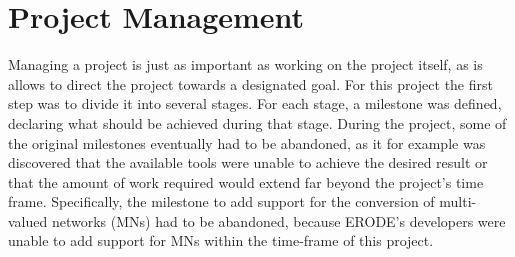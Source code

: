 \chapter{Project Management} \label{management}
Managing a project is just as important as working on the project itself, as is allows to direct the project towards a designated goal. For this project the first step was to divide it into several stages. For each stage, a milestone was defined, declaring what should be achieved during that stage. During the project, some of the original milestones eventually had to be abandoned, as it for example was discovered that the available tools were unable to achieve the desired result or that the amount of work required would extend far beyond the project's time frame. Specifically, the milestone to add support for the conversion of multi-valued networks (MNs) had to be abandoned, because ERODE's developers were unable to add support for MNs within the time-frame of this project.

